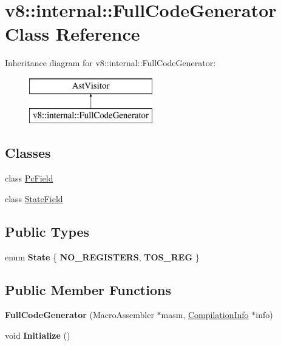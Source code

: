 \hypertarget{classv8_1_1internal_1_1_full_code_generator}{}\section{v8\+:\+:internal\+:\+:Full\+Code\+Generator Class Reference}
\label{classv8_1_1internal_1_1_full_code_generator}
Inheritance diagram for v8\+:\+:internal\+:\+:Full\+Code\+Generator\+:\begin{figure}[H]
\begin{center}
\leavevmode
\includegraphics[height=2.000000cm]{classv8_1_1internal_1_1_full_code_generator}
\end{center}
\end{figure}
\subsection*{Classes}
\begin{DoxyCompactItemize}
\item 
class \hyperlink{classv8_1_1internal_1_1_full_code_generator_1_1_pc_field}{Pc\+Field}
\item 
class \hyperlink{classv8_1_1internal_1_1_full_code_generator_1_1_state_field}{State\+Field}
\end{DoxyCompactItemize}
\subsection*{Public Types}
\begin{DoxyCompactItemize}
\item 
\hypertarget{classv8_1_1internal_1_1_full_code_generator_abccd621180f301a694c266a6e724d9d9}{}enum {\bfseries State} \{ {\bfseries N\+O\+\_\+\+R\+E\+G\+I\+S\+T\+E\+R\+S}, 
{\bfseries T\+O\+S\+\_\+\+R\+E\+G}
 \}\label{classv8_1_1internal_1_1_full_code_generator_abccd621180f301a694c266a6e724d9d9}

\end{DoxyCompactItemize}
\subsection*{Public Member Functions}
\begin{DoxyCompactItemize}
\item 
\hypertarget{classv8_1_1internal_1_1_full_code_generator_aca7a23314040488a80ea5ffdb95bdb1e}{}{\bfseries Full\+Code\+Generator} (Macro\+Assembler $\ast$masm, \hyperlink{classv8_1_1internal_1_1_compilation_info}{Compilation\+Info} $\ast$info)\label{classv8_1_1internal_1_1_full_code_generator_aca7a23314040488a80ea5ffdb95bdb1e}

\item 
\hypertarget{classv8_1_1internal_1_1_full_code_generator_ad877afd6ba30a8379c8f0ad49865d0c3}{}void {\bfseries Initialize} ()\label{classv8_1_1internal_1_1_full_code_generator_ad877afd6ba30a8379c8f0ad49865d0c3}

\end{DoxyCompactItemize}

